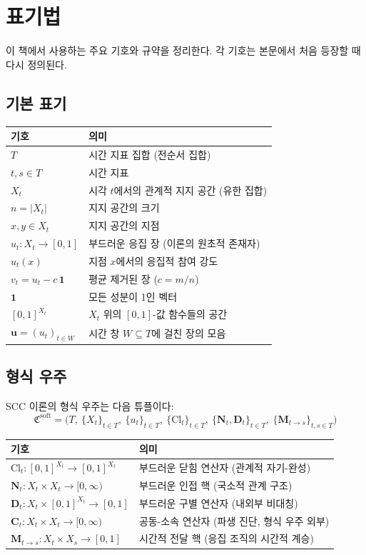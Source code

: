 
\chapter*{표기법}

이 책에서 사용하는 주요 기호와 규약을 정리한다. 각 기호는 본문에서 처음 등장할 때 다시 정의된다.


\section*{기본 표기}

\begin{tabular}{lp{11cm}}
\hline
\textbf{기호} & \textbf{의미} \\
\hline
$T$ & 시간 지표 집합 (전순서 집합) \\
$t, s \in T$ & 시간 지표 \\
$X_t$ & 시각 $t$에서의 관계적 지지 공간 (유한 집합) \\
$n = |X_t|$ & 지지 공간의 크기 \\
$x, y \in X_t$ & 지지 공간의 지점 \\
$u_t : X_t \to [0,1]$ & 부드러운 응집 장 (이론의 원초적 존재자) \\
$u_t(x)$ & 지점 $x$에서의 응집적 참여 강도 \\
$v_t = u_t - c\,\mathbf{1}$ & 평균 제거된 장 ($c = m/n$) \\
$\mathbf{1}$ & 모든 성분이 1인 벡터 \\
$[0,1]^{X_t}$ & $X_t$ 위의 $[0,1]$-값 함수들의 공간 \\
$\mathbf{u} = (u_t)_{t \in W}$ & 시간 창 $W \subseteq T$에 걸친 장의 모음 \\
\hline
\end{tabular}


\section*{형식 우주}

SCC 이론의 형식 우주는 다음 튜플이다:
$$
\mathfrak{C}^{\mathrm{soft}} = \Big( T,\ \{X_t\}_{t \in T},\ \{u_t\}_{t \in T},\ \{\mathrm{Cl}_t\}_{t \in T},\ \{\mathbf{N}_t, \mathbf{D}_t\}_{t \in T},\ \{\mathbf{M}_{t \to s}\}_{t,s \in T} \Big)
$$

\begin{tabular}{lp{11cm}}
\hline
\textbf{기호} & \textbf{의미} \\
\hline
$\mathrm{Cl}_t : [0,1]^{X_t} \to [0,1]^{X_t}$ & 부드러운 닫힘 연산자 (관계적 자기-완성) \\
$\mathbf{N}_t : X_t \times X_t \to [0,\infty)$ & 부드러운 인접 핵 (국소적 관계 구조) \\
$\mathbf{D}_t : X_t \times [0,1]^{X_t} \to [0,1]$ & 부드러운 구별 연산자 (내외부 비대칭) \\
$\mathbf{C}_t : X_t \times X_t \to [0,\infty)$ & 공동-소속 연산자 (파생 진단, 형식 우주 외부) \\
$\mathbf{M}_{t \to s} : X_t \times X_s \to [0,1]$ & 시간적 전달 핵 (응집 조직의 시간적 계승) \\
\hline
\end{tabular}


